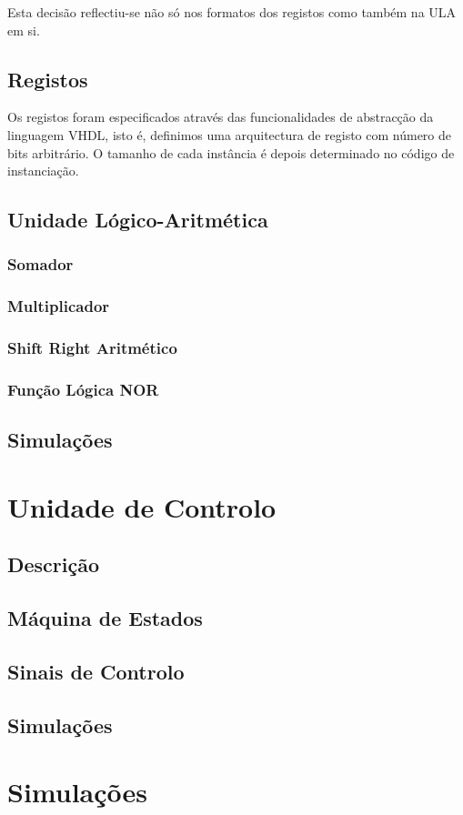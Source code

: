 \documentclass[a4paper]{article}
\begin{document}
Esta decisão reflectiu-se não só nos formatos dos registos como também na ULA em si.


\subsection{Registos}
Os registos foram especificados através das funcionalidades de abstracção da linguagem VHDL, isto é, definimos uma arquitectura de registo com número de bits arbitrário. O tamanho de cada instância é depois determinado no código de instanciação.


\subsection{Unidade Lógico-Aritmética}
\subsubsection{Somador}
\subsubsection{Multiplicador}
\subsubsection{Shift Right Aritmético}
\subsubsection{Função Lógica NOR}
\pagebreak
\subsection{Simulações}
\pagebreak


\section{Unidade de Controlo}
\subsection{Descrição}
\subsection{Máquina de Estados}
\subsection{Sinais de Controlo}
\pagebreak
\subsection{Simulações}
\pagebreak


\section{Simulações}
\end{document}
